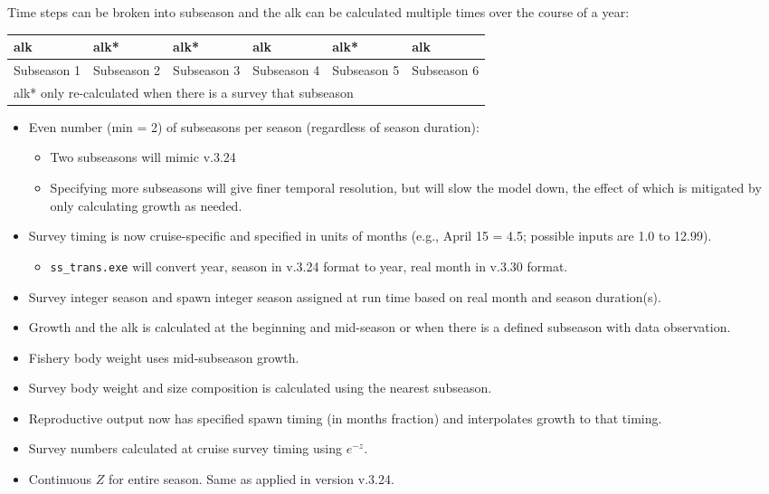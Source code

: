 Time steps can be broken into subseason and the \gls{alk} can be calculated multiple times over the course of a year:
\vspace*{-\baselineskip}
\begin{center}
	\begin{tabular}{|p{2.37cm}|p{2.37cm}|p{2.37cm}|p{2.37cm}|p{2.37cm}|p{2.37cm}|}
		\hline
		\gls{alk} & \gls{alk}* & \gls{alk}* & \gls{alk} & \gls{alk}* & \gls{alk} \Tstrut\Bstrut\\
		\hline
		Subseason 1 & Subseason 2 & Subseason 3 & Subseason 4 & Subseason 5 & Subseason 6 \Tstrut\Bstrut\\		
		\hline
		\multicolumn{6}{l}{\gls{alk}* only re-calculated when there is a survey that subseason} \Tstrut\Bstrut\\			
	\end{tabular}
\end{center}

\begin{itemize}
	\item Even number (min = 2) of subseasons per season (regardless of season duration):
		\begin{itemize}
			\item Two subseasons will mimic v.3.24
			\item Specifying more subseasons will give finer temporal resolution, but will slow the model down, the effect of which is mitigated by only calculating growth as needed.
		\end{itemize}
	\item Survey timing is now cruise-specific and specified in units of months (e.g., April 15 = 4.5; possible inputs are 1.0 to 12.99).
		\begin{itemize}
			\item \texttt{ss\_trans.exe} will convert year, season in v.3.24 format to year, real month in v.3.30 format.
		\end{itemize}
	\item Survey integer season and spawn integer season assigned at run time based on real month and season duration(s).
	\item Growth and the \gls{alk} is calculated at the beginning and mid-season or when there is a defined subseason with data observation.
	\item Fishery body weight uses mid-subseason growth.
	\item Survey body weight and size composition is calculated using the nearest subseason.
	\item Reproductive output now has specified spawn timing (in months fraction) and interpolates growth to that timing.
	\item Survey numbers calculated at cruise survey timing using $e^{-z}$.
	\item Continuous $Z$ for entire season. Same as applied in version v.3.24.
\end{itemize}


